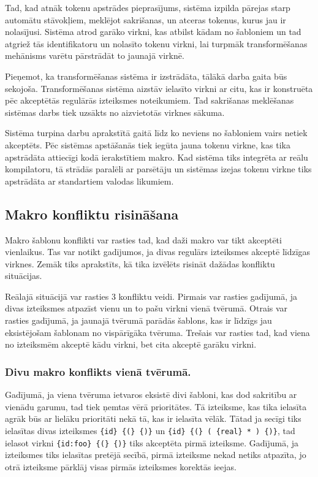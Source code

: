 Tad, kad atnāk tokenu apstrādes pieprasījums, sistēma izpilda pārejas starp automātu stāvokļiem, meklējot sakrišanas, un atceras tokenus, kurus jau ir nolasījusi. Sistēma atrod garāko virkni, kas atbilst kādam no šabloniem un tad atgriež tās identifikatoru un nolasīto tokenu virkni, lai turpmāk transformēšanas mehānisms varētu pārstrādāt to jaunajā virknē.

Pieņemot, ka transformēšanas sistēma ir izstrādāta, tālākā darba gaita būs sekojoša. Transformēšanas sistēma aizstāv ielasīto virkni ar citu, kas ir konstruēta pēc akceptētās regulārās izteiksmes noteikumiem. Tad sakrišanas meklēšanas sistēmas darbs tiek uzsākts no aizvietotās virknes sākuma.

Sistēma turpina darbu aprakstītā gaitā līdz ko neviens no šabloniem vairs netiek akceptēts. Pēc sistēmas apstāšanās tiek iegūta jauna tokenu virkne, kas tika apstrādāta attiecīgi kodā ierakstītiem makro. Kad sistēma tiks integrēta ar reālu kompilatoru, tā strādās paralēli ar parsētāju un sistēmas izejas tokenu virkne tiks apstrādāta ar standartiem valodas likumiem.

\subsection{\label{solution_conflictresolving}Makro konfliktu risināšana}
Makro šablonu konflikti var rasties tad, kad daži makro var tikt akceptēti vienlaikus. Tas var notikt gadījumos, ja divas regulārs izteiksmes akceptē līdzīgas virknes. Zemāk tiks aprakstīts, kā tika izvēlēts risināt dažādas konfliktu situācijas. 

Reālajā situācijā var rasties 3 konfliktu veidi. Pirmais var rasties gadījumā, ja divas izteiksmes atpazīst vienu un to pašu virkni vienā tvērumā. Otrais var rasties gadījumā, ja jaunajā tvērumā parādās šablons, kas ir līdzīgs jau eksistējošam šablonam no vispārīgāka tvēruma. Trešais var rasties tad, kad viena no izteiksmēm akceptē kādu virkni, bet cita akceptē garāku virkni.

\subsubsection{Divu makro konflikts vienā tvērumā.}

Gadījumā, ja viena tvēruma ietvaros eksistē divi šabloni, kas dod sakritību ar vienādu garumu, tad tiek ņemtas vērā prioritātes. Tā izteiksme, kas tika ielasīta agrāk būs ar lielāku prioritāti nekā tā, kas ir ielasīta vēlāk. Tātad ja secīgi tiks ielasītas divas izteiksmes \verb|{id} {(} {)}| un \verb|{id} {(} ( {real} * ) {)}|, tad ielasot virkni \verb|{id:foo} {(} {)}| tiks akceptēta pirmā izteiksme. Gadījumā, ja izteiksmes tiks ielasītas pretējā secībā, pirmā izteiksme nekad netiks atpazīta, jo otrā izteiksme pārklāj visas pirmās izteiksmes korektās ieejas.


